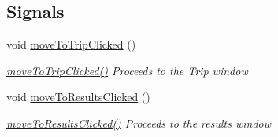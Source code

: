 \subsection*{Signals}
\begin{DoxyCompactItemize}
\item 
void \mbox{\hyperlink{class_souvenir_window_a711717cbb7f22fe11e3778126a0b4577}{move\+To\+Trip\+Clicked}} ()
\begin{DoxyCompactList}\small\item\em \mbox{\hyperlink{class_souvenir_window_a711717cbb7f22fe11e3778126a0b4577}{move\+To\+Trip\+Clicked()}} Proceeds to the Trip window \end{DoxyCompactList}\item 
void \mbox{\hyperlink{class_souvenir_window_a6528ccd60ed871aa9f5f7dc1fb84b67f}{move\+To\+Results\+Clicked}} ()
\begin{DoxyCompactList}\small\item\em \mbox{\hyperlink{class_souvenir_window_a6528ccd60ed871aa9f5f7dc1fb84b67f}{move\+To\+Results\+Clicked()}} Proceeds to the results window \end{DoxyCompactList}\end{DoxyCompactItemize}
